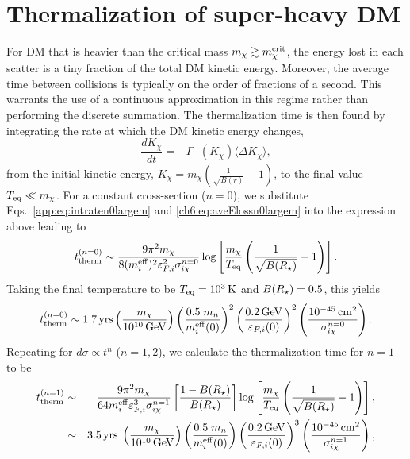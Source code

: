 \section{Thermalization of super-heavy DM}
\label{app:sec:thermsuperheavy}



For DM that is heavier than the critical mass  $m_\chi\gtrsim m_\chi^{\rm crit}$,
the energy lost in each scatter is a tiny fraction of the total DM kinetic energy. Moreover, the average time between collisions is typically on the order of fractions of a second. This warrants the use of a continuous approximation in this regime rather than performing the discrete summation. The thermalization time is then found by integrating the rate at which the DM kinetic energy changes, 
\begin{equation}
    \frac{dK_\chi}{dt} = -\Gamma^{-}(K_\chi) \langle\Delta K_\chi\rangle,  
    \label{app:eq:contttherm}
\end{equation}
from the initial kinetic energy, $K_\chi=m_\chi\left(\frac{1}{\sqrt{B(r)}}-1\right)$, to the final value $T_{\rm eq}\ll m_\chi$. For a constant cross-section ($n=0$), we substitute  Eqs.~\ref{app:eq:intraten0largem} and \ref{ch6:eq:aveElossn0largem} into the expression above leading to
\begin{equation}
    t_{\rm therm}^{(n=0)} \sim \frac{9 \pi^2 m_\chi}{8 (m_i^{\rm eff})^2 \varepsilon_{F,i}^2 \sigma_{i\chi}^{n=0}}\log\left[\frac{m_\chi}{T_{\rm eq}}\left(\frac{1}{\sqrt{B(R_\star)}}-1\right)\right].
    \label{app:eq:tthemheavy0}
\end{equation}
Taking the final temperature to be $T_{\rm eq}=10^3{\rm \,K}$ and $B(R_\star)=0.5$, this yields 
\begin{equation}
    t_{\rm therm}^{(n=0)} \sim 1.7  {\rm \,yrs} \left(\frac{m_\chi }{10^{10}{\rm \,GeV}}\right)\left(\frac{0.5\;m_n}{m_i^{\rm eff}(0)}\right)^{2}\left(\frac{0.2{\rm \,GeV}}{\varepsilon_{F,i}(0)}\right)^{2}\left(\frac{10^{-45}{\rm \,cm}^2}{\sigma_{i\chi}^{n=0}}\right).    
\end{equation}
%
Repeating for $d\sigma\propto t^n$ ($n=1,2$), we calculate the thermalization time for $n=1$ to be
\begin{eqnarray}
    t_{\rm therm}^{(n=1)} &\sim& \frac{9\pi^2 m_\chi}{ 64 m_i^{\rm eff} \varepsilon_{F,i}^3 \sigma_{i\chi}^{n=1}}\left[\frac{1-B(R_\star)}{B(R_\star)}\right] \log\left[\frac{m_\chi}{T_{\rm eq}} \left(\frac{1}{\sqrt{B(R_\star)}}-1\right)\right],\\
    &\sim& 3.5 {\rm \,yrs}\; \left(\frac{m_\chi}{10^{10} {\rm \,GeV}}\right)\left(\frac{0.5\;m_n}{m_i^{\rm eff}(0)}\right) \left(\frac{0.2{\rm \,GeV}}{\varepsilon_{F,i}(0)}\right)^{3}\left(\frac{10^{-45}{\rm \,cm}^2}{\sigma_{i\chi}^{n=1}}\right),
\end{eqnarray}
